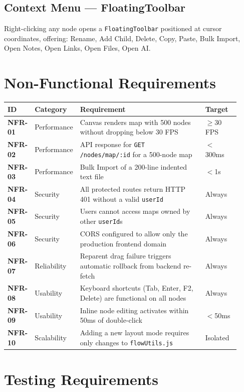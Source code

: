 \documentclass[12pt, a4paper]{article}
\begin{document}
\subsection{Context Menu — FloatingToolbar}
Right-clicking any node opens a \texttt{FloatingToolbar} positioned at cursor coordinates, offering:
Rename, Add Child, Delete, Copy, Paste, Bulk Import, Open Notes, Open Links, Open Files, Open AI.

\section{Non-Functional Requirements}

\begin{longtable}{>{\bfseries}p{0.06\linewidth} p{0.14\linewidth} p{0.57\linewidth} p{0.15\linewidth}}
\toprule
ID & Category & Requirement & Target \\
\midrule
\endfirsthead
NFR-01 & Performance & Canvas renders map with 500 nodes without dropping below 30 FPS & $\geq$30 FPS \\
NFR-02 & Performance & API response for \texttt{GET /nodes/map/:id} for a 500-node map & $<$300ms \\
NFR-03 & Performance & Bulk Import of a 200-line indented text file & $<$1s \\
NFR-04 & Security & All protected routes return HTTP 401 without a valid \texttt{userId} & Always \\
NFR-05 & Security & Users cannot access maps owned by other \texttt{userId}s & Always \\
NFR-06 & Security & CORS configured to allow only the production frontend domain & Always \\
NFR-07 & Reliability & Reparent drag failure triggers automatic rollback from backend re-fetch & Always \\
NFR-08 & Usability & Keyboard shortcuts (Tab, Enter, F2, Delete) are functional on all nodes & Always \\
NFR-09 & Usability & Inline node editing activates within 50ms of double-click & $<$50ms \\
NFR-10 & Scalability & Adding a new layout mode requires only changes to \texttt{flowUtils.js} & Isolated \\
\bottomrule
\end{longtable}

\section{Testing Requirements}
\end{document}
